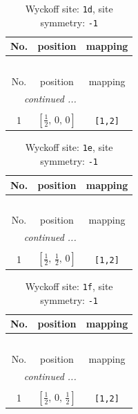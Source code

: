 \documentclass[fleqn,8pt]{jsarticle}
\begin{document}
\renewcommand{\arraystretch}{1.2}
\begin{longtable}{ccc}
\caption{Wyckoff site: {\tt 1d}, site symmetry: {\tt -1}}
 \\
 \hline \hline
No. & position & mapping \\ \hline \endfirsthead

\multicolumn{2}{l}{\tablename\ \thetable{}} \\
 \hline \hline
No. & position & mapping \\ \hline \endhead

 \hline \hline
\multicolumn{2}{r}{\footnotesize\it continued ...} \\ \endfoot

 \hline \hline
\multicolumn{2}{r}{} \\ \endlastfoot

1 & $\left[ \frac{1}{2},\, 0,\, 0 \right]$ & {\tt [1,2]} \\
\end{longtable}
\renewcommand{\arraystretch}{1.2}
\begin{longtable}{ccc}
\caption{Wyckoff site: {\tt 1e}, site symmetry: {\tt -1}}
 \\
 \hline \hline
No. & position & mapping \\ \hline \endfirsthead

\multicolumn{2}{l}{\tablename\ \thetable{}} \\
 \hline \hline
No. & position & mapping \\ \hline \endhead

 \hline \hline
\multicolumn{2}{r}{\footnotesize\it continued ...} \\ \endfoot

 \hline \hline
\multicolumn{2}{r}{} \\ \endlastfoot

1 & $\left[ \frac{1}{2},\, \frac{1}{2},\, 0 \right]$ & {\tt [1,2]} \\
\end{longtable}
\renewcommand{\arraystretch}{1.2}
\begin{longtable}{ccc}
\caption{Wyckoff site: {\tt 1f}, site symmetry: {\tt -1}}
 \\
 \hline \hline
No. & position & mapping \\ \hline \endfirsthead

\multicolumn{2}{l}{\tablename\ \thetable{}} \\
 \hline \hline
No. & position & mapping \\ \hline \endhead

 \hline \hline
\multicolumn{2}{r}{\footnotesize\it continued ...} \\ \endfoot

 \hline \hline
\multicolumn{2}{r}{} \\ \endlastfoot

1 & $\left[ \frac{1}{2},\, 0,\, \frac{1}{2} \right]$ & {\tt [1,2]} \\
\end{longtable}
\end{document}

